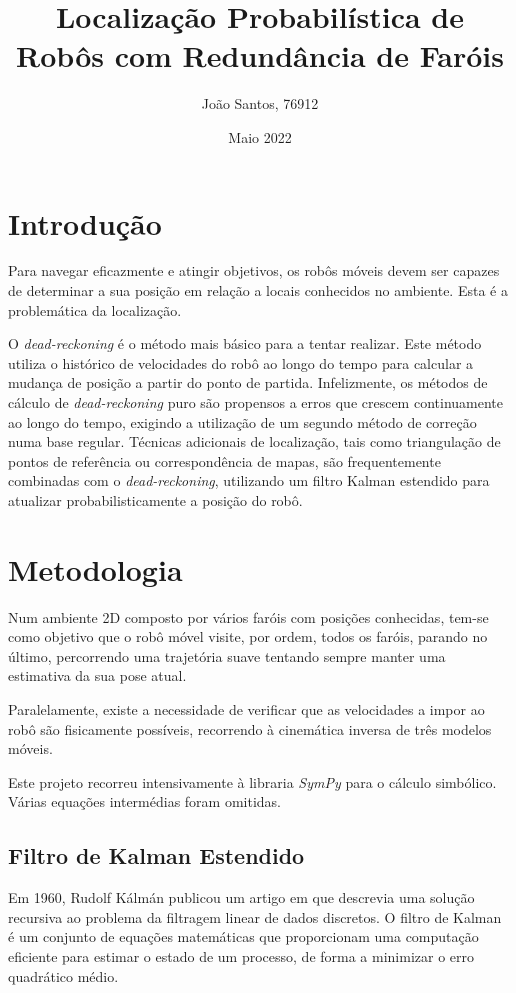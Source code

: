\documentclass[twocolumn]{article}
\title{Localização Probabilística de Robôs com Redundância de Faróis}
\author[1]{João Santos, 76912}
\affil[1]{Departamento de Eletrónica, Telecomunicações e Informática, Universidade de Aveiro}
\date{Maio 2022}
\begin{document}
\maketitle

\section{Introdução}

Para navegar eficazmente e atingir objetivos, os robôs móveis devem ser capazes de determinar a sua posição em relação a locais conhecidos no ambiente. Esta é a problemática da localização.

O \textit{dead-reckoning} é o método mais básico para a tentar realizar\cite{833191}. Este método utiliza o histórico de velocidades do robô ao longo do tempo para calcular a mudança de posição a partir do ponto de partida. Infelizmente, os métodos de cálculo de \textit{dead-reckoning} puro são propensos a erros que crescem continuamente ao longo do tempo, exigindo a utilização de um segundo método de correção numa base regular. Técnicas adicionais de localização, tais como triangulação de pontos de referência ou correspondência de mapas, são frequentemente combinadas com o \textit{dead-reckoning}, utilizando um filtro Kalman estendido para atualizar probabilisticamente a posição do robô.

\section{Metodologia}

Num ambiente 2D composto por vários faróis com posições conhecidas, tem-se como objetivo que o robô móvel visite, por ordem, todos os faróis, parando no último, percorrendo uma trajetória suave tentando sempre manter uma estimativa da sua pose atual.

Paralelamente, existe a necessidade de verificar que as velocidades a impor ao robô são fisicamente possíveis, recorrendo à cinemática inversa de três modelos móveis.

Este projeto recorreu intensivamente à libraria \textit{SymPy}\cite{sympy} para o cálculo simbólico. Várias equações intermédias foram omitidas.

\subsection{Filtro de Kalman Estendido}

Em 1960, Rudolf Kálmán publicou um artigo\cite{kalman1960} em que descrevia uma solução recursiva ao problema da filtragem linear de dados discretos. O filtro de Kalman é um conjunto de equações matemáticas que proporcionam uma computação eficiente para estimar o estado de um processo, de forma a minimizar o erro quadrático médio.
\end{document}
